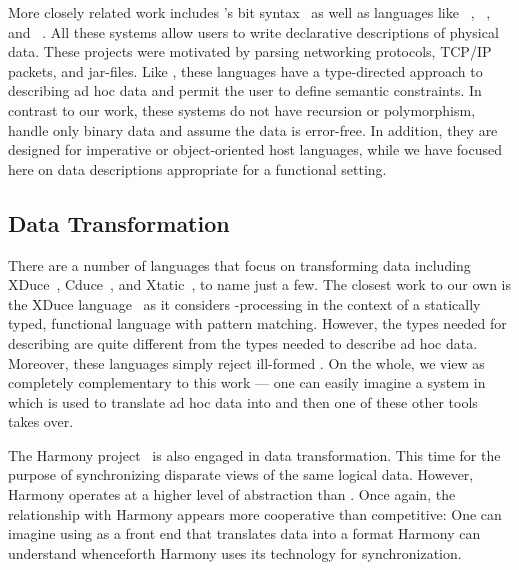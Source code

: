 \documentclass[11pt]{article}
\begin{document}
More closely related work includes \erlang{}'s bit
syntax~\cite{erlang} as well as languages like \packettypes~\cite{sigcomm00},
\datascript~\cite{gpce02}, and \blt~\cite{eger:blt}. 
All these systems allow users to write declarative
descriptions of physical data.  These projects were motivated by
parsing networking protocols, \textsc{TCP/IP} packets, and \java{} 
jar-files.  Like \datatype, these languages have a type-directed
approach to describing ad hoc data and permit the user to define
semantic constraints.  In contrast to our work, these systems 
do not have recursion or polymorphism, handle
only binary data and assume the data is error-free.
In addition, they are designed for imperative or object-oriented host
languages, while we have focused here on data descriptions appropriate for a
functional setting.

\subsection{Data Transformation}
There are a number of languages that focus on transforming \xml{}
data including XDuce~\cite{hosoya+:xduce-journal}, 
Cduce~\cite{benzaken+:cduce}, and 
Xtatic~\cite{gapeyev+:XtaticRuntime}, to name just a few.
The closest work to our own is the XDuce
language~\cite{hosoya+:xduce-journal} as it considers
\xml-processing in the context of a
statically typed, functional language with pattern matching. 
However, the types needed for describing \xml{} are quite different
from the types needed to describe ad hoc data.  Moreover,
these languages simply reject ill-formed \xml.  On the whole,
we view \datatype{} as completely complementary to this work ---
one can easily imagine a system in which \datatype{} is used to translate
ad hoc data into \xml{} and then one of these other tools takes over.
 
The Harmony project~\cite{foster+:lenses} is also engaged in 
data transformation.  This time for the purpose of synchronizing
disparate views of the same logical data. 
However, Harmony operates at a higher 
level of abstraction than \datatype.  Once again, the relationship 
with Harmony appears more cooperative than competitive:  One can 
imagine using \datatype{} as a front end that translates data into 
a format Harmony can understand whenceforth Harmony uses
its technology for synchronization.  

{

}
\end{document}
